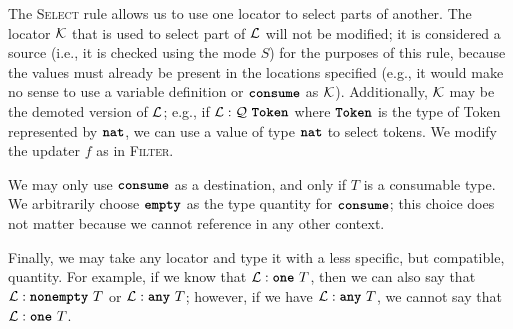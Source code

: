 \documentclass[nonacm, dvipsnames, sigconf]{acmart}
\begin{document}
The \textsc{Select} rule allows us to use one locator to select parts of another.
The locator $\LocK$ that is used to select part of $\Loc$ will not be modified; it is considered a source (i.e., it is checked using the mode $S$) for the purposes of this rule, because the values must already be present in the locations specified (e.g., it would make no sense to use a variable definition or $\consume$ as $\LocK$).
Additionally, $\LocK$ may be the demoted version of $\Loc$; e.g., if $\Loc : \mathcal{Q}~\texttt{\textbf{Token}}$ where $\textbf{\texttt{Token}}$ is the type of Token represented by $\natt$, we can use a value of type $\natt$ to select tokens.
We modify the updater $f$ as in \textsc{Filter}.
\begin{mathpar}
\end{mathpar}

We may only use $\consume$ as a destination, and only if $T$ is a consumable type.
We arbitrarily choose $\emptyq$ as the type quantity for $\consume$; this choice does not matter because we cannot reference \consume in any other context.
\begin{mathpar}
\end{mathpar}

Finally, we may take any locator and type it with a less specific, but compatible, quantity.
For example, if we know that $\Loc : \exactlyone~T$, then we can also say that $\Loc : \nonempty~T$ or $\Loc : \any~T$; however, if we have $\Loc : \any~T$, we cannot say that $\Loc : \exactlyone~T$.
\begin{mathpar}
\end{mathpar}
\end{document}
